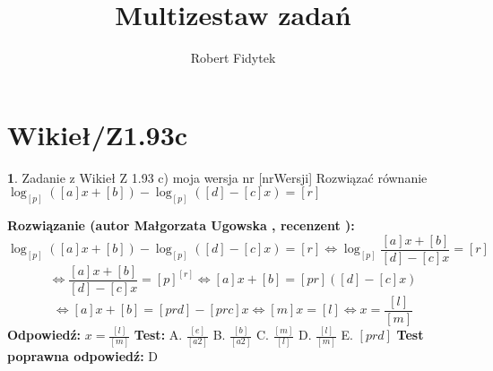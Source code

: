 \documentclass[12pt, a4paper]{article}
\title{Multizestaw zadań}
\author{Robert Fidytek}
\date{}
\theoremstyle{definition} %
\newtheorem{zad}{}
\newcommand{\kategoria}[1]{\section{#1}} %
\newcommand{\zadStart}[1]{\begin{zad}#1\newline} %
\newcommand{\zadStop}{\end{zad}}   %
\newcommand{\rozwStart}[2]{\noindent \textbf{Rozwiązanie (autor #1 , recenzent #2): }\newline} %
\newcommand{\rozwStop}{\newline}                                            %
\newcommand{\odpStart}{\noindent \textbf{Odpowiedź:}\newline}    %
\newcommand{\odpStop}{\newline}                                             %
\newcommand{\testStart}{\noindent \textbf{Test:}\newline} %
\newcommand{\testStop}{\newline} %
\newcommand{\kluczStart}{\noindent \textbf{Test poprawna odpowiedź:}\newline} %
\newcommand{\kluczStop}{\newline} %
\begin{document}
\maketitle


\kategoria{Wikieł/Z1.93c}
\zadStart{Zadanie z Wikieł Z 1.93 c) moja wersja nr [nrWersji]}
Rozwiązać równanie $\log_{[p]}{([a]x+[b])} - \log_{[p]}{([d]-[c]x)} = [r]$
\zadStop
\rozwStart{Małgorzata Ugowska}{}
$$\log_{[p]}{([a]x+[b])} - \log_{[p]}{([d]-[c]x)} = [r] \Longleftrightarrow \log_{[p]}{\frac{[a]x+[b]}{[d]-[c]x}}= [r]$$
$$\Longleftrightarrow \frac{[a]x+[b]}{[d]-[c]x}=[p]^{[r]} \Longleftrightarrow  [a]x+[b]=[pr]([d]-[c]x)$$
$$\Longleftrightarrow [a]x+[b]=[prd]-[prc]x \Longleftrightarrow [m]x=[l] \Longleftrightarrow x=\frac{[l]}{[m]}$$
\rozwStop
\odpStart
$x=\frac{[l]}{[m]}$
\odpStop
\testStart
A. $\frac{[e]}{[a2]}$
B. $\frac{[b]}{[a2]}$
C. $\frac{[m]}{[l]}$
D. $\frac{[l]}{[m]}$
E. $[prd]$
\testStop
\kluczStart
D
\kluczStop
\end{document}
